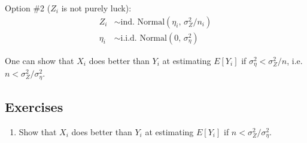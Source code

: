 \documentclass{article}
\begin{document}
      Option \#2 ($Z_i$ is not purely luck):
      \begin{align*}
        Z_i &\sim \mbox{ind. Normal}(\eta_i,\, \sigma^2_Z / n_i)\\
        \eta_i &\sim \mbox{i.i.d. Normal}(0,\, \sigma^2_\eta)
      \end{align*}

      One can show that $X_i$ does better than $Y_i$ at estimating $E[Y_i]$ if $\sigma^2_\eta < \sigma^2_Z / n$, i.e. $n < \sigma^2_Z / \sigma^2_\eta$.

    \subsection{\sc Exercises}
    
    \begin{enumerate}
      \item Show that $X_i$ does better than $Y_i$ at estimating $E[Y_i]$ if $n < \sigma^2_Z / \sigma^2_\eta$.
    \end{enumerate}
\end{document}
